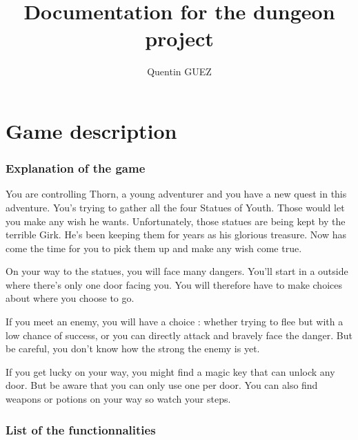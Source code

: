 \documentclass[11pt]{extarticle}
\title{\Huge{Documentation for the dungeon project}}
\author{Quentin GUEZ}
\date{}
\begin{document}
\maketitle

\tableofcontents

\clearpage

\part{Game description}

\section{Explanation of the game}

You are controlling Thorn, a young adventurer and you have a new quest in this adventure. You's trying to gather all the four Statues of Youth. Those would let you make any wish he wants. Unfortunately, those statues are being kept by the terrible Girk. He's been keeping them for years as his glorious treasure. Now has come the time for you to pick them up and make any wish come true.

On your way to the statues, you will face many dangers. You'll start in a outside where there's only one door facing you. You will therefore have to make choices about where you choose to go. 

If you meet an enemy, you will have a choice : whether trying to flee but with a low chance of success, or you can directly attack and bravely face the danger. But be careful, you don't know how the strong the enemy is yet. 

If you get lucky on your way, you might find a magic key that can unlock any door. But be aware that you can only use one per door. You can also find weapons or potions on your way so watch your steps.

\section{List of the functionnalities}
\end{document}
